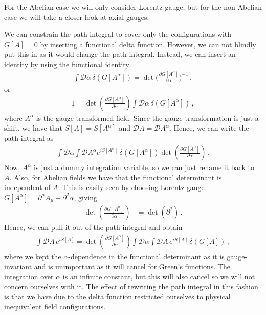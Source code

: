 For the Abelian case we will only consider Lorentz gauge, but for the non-Abelian case we will take a closer look at axial gauges. 

We can constrain the path integral to cover only the configurations with $G[A]=0$ by inserting a functional delta function. However, we can not blindly put this in as it would change the path integral. Instead, we can insert an identity by using the functional identity
\begin{align}\label{eq:functional identity}
    \int\mathcal{D}\alpha\,\delta(G[A^{\alpha}])=\det\Big(\frac{\partial G[A^{\alpha}]}{\partial\alpha}\Big)^{-1}\,,
\end{align}
or
\begin{align}
    1=\det(\frac{\partial G[A^{\alpha}]}{\partial\alpha})\int\mathcal{D}\alpha\,\delta(G[A^{\alpha}])\,,
\end{align}
where $A^{\alpha}$ is the gauge-transformed field. Since the gauge transformation is just a shift, we have that $S[A]=S[A^{\alpha}]$ and $\mathcal{D}A=\mathcal{D}A^{\alpha}$. Hence, we can write the path integral as
\begin{align}
    \int\mathcal{D}\alpha\int\mathcal{D}A^{\alpha}e^{iS[A^{\alpha}]}\,\delta(G[A^{\alpha}])\det(\frac{\partial G[A^{\alpha}]}{\partial\alpha})\,.
\end{align}
Now, $A^{\alpha}$ is just a dummy integration variable, so we can just rename it back to $A$. Also, for Abelian fields we have that the functional determinant is independent of $A$. This is easily seen by choosing Lorentz gauge $G[A^{\alpha}]=\partial^{\mu}A_{\mu}+\partial^{2}\alpha$, giving
\begin{align}
    \det(\frac{\partial G[A^{\alpha}]}{\partial\alpha})&=\det(\partial^{2})\,.
\end{align}
Hence, we can pull it out of the path integral and obtain
\begin{align}
    \int\mathcal{D}A\,e^{iS[A]}=\det(\frac{\partial G[A^{\alpha}]}{\partial\alpha})\int\mathcal{D}\alpha\int\mathcal{D}A\,e^{iS[A]}\,\delta(G[A])\,,
\end{align}
where we kept the $\alpha$-dependence in the functional determinant as it is gauge-invariant and is unimportant as it will cancel for Green's functions. The integration over $\alpha$ is an infinite constant, but this will also cancel so we will not concern ourselves with it. The effect of rewriting the path integral in this fashion is that we have due to the delta function restricted ourselves to physical inequivalent field configurations. 


